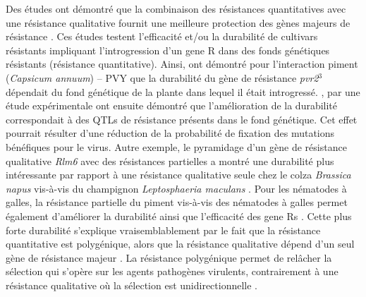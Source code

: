 	Des études ont démontré que la combinaison des résistances quantitatives avec une résistance qualitative fournit une meilleure protection des gènes majeurs de résistance \citep{Palloix2009, Brun2010, Delourme2014}. Ces études testent l'efficacité et/ou la durabilité de cultivars résistants impliquant l'introgression d'un \gls{gene R} dans des fonds génétiques \og résistants \fg{} (résistance quantitative). Ainsi,  \citet{Palloix2009} ont  démontré pour  l'interaction piment (\textit{Capsicum annuum}) –  \gls{PVY} que la durabilité du gène de résistance  \textit{pvr2}$^3$  dépendait du fond génétique de la plante dans lequel il était introgressé. \citet{Quenouille2014}, par une étude expérimentale  ont ensuite démontré que l'amélioration de la durabilité correspondait à des \glspl{QTL} de résistance présents dans le fond génétique. Cet effet pourrait résulter d'une réduction de la probabilité de fixation des mutations  bénéfiques pour le virus. Autre exemple, le pyramidage d’un gène de
résistance qualitative \textit{Rlm6}  avec des résistances partielles a montré une durabilité plus intéressante par rapport à une résistance qualitative seule chez le colza \textit{Brassica
napus}  vis-à-vis du champignon \textit{Leptosphaeria maculans} \citep{Brun2010}.
Pour les nématodes à galles, la résistance partielle du piment vis-à-vis des nématodes à galles permet également d'améliorer 
la durabilité ainsi que l'efficacité des \glspl{gene R}  \citep{Barbary2014}.
Cette  plus forte durabilité s'explique  vraisemblablement  par le fait que la résistance quantitative est polygénique, alors que la résistance qualitative dépend d'un seul gène de résistance majeur \citep{Mundt2014, Parlevliet1989}. La résistance polygénique permet de relâcher la  sélection qui s'opère sur les agents pathogènes virulents, contrairement à une résistance qualitative où la sélection est unidirectionnelle \citep{Quenouille2014, Bourguet2016}.

